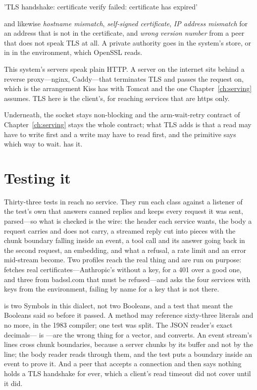 \begin{plain}
'TLS handshake: certificate verify failed: certificate has expired'
\end{plain}

and likewise \emph{hostname mismatch}, \emph{self-signed certificate},
\emph{IP address mismatch} for an address that is not in the certificate,
and \emph{wrong version number} from a peer that does not speak TLS at
all. A private authority goes in the system's store, or in
 in the environment, which OpenSSL reads.

\begin{stwarn}
This system's servers speak plain HTTP. A server on the internet sits
behind a reverse proxy---nginx, Caddy---that terminates TLS and passes the
request on, which is the arrangement Kiss has with Tomcat and the one
Chapter~\ref{ch:serving} assumes. TLS here is the client's, for reaching
services that are https only.
\end{stwarn}

Underneath, the socket stays non-blocking and the arm-wait-retry contract
of Chapter~\ref{ch:serving} stays the whole contract; what TLS adds is that
a read may have to write first and a write may have to read first, and the
primitive says which way to wait.  has it.

\section{Testing it}

Thirty-three tests in  reach no service. They run each
class against a listener of the test's own that answers canned replies
and keeps every request it was sent, parsed---so what is checked is the
wire: the header each service wants, the body a request carries and does
not carry, a streamed reply cut into pieces with the chunk boundary falling
inside an event, a tool call and its answer going back in the second
request, an embedding, and what a refusal, a rate limit and an error
mid-stream become. Two profiles reach the real thing and are run on
purpose:  fetches real certificates---Anthropic's without
a key, for a 401 over a good one, and three from badssl.com that must be
refused---and  asks the four services with keys from the
environment, failing by name for a key that is not there.

\begin{stnote}
 is two Symbols in this dialect, not two Booleans, and a
test that meant the Booleans said so before it passed. A method may
reference sixty-three literals and no more, in the 1983 compiler; one test
was split. The JSON reader's exact decimals--- is ---are
the wrong thing for a vector, and  converts. An event stream's
lines cross chunk boundaries, because a server chunks by its buffer and
not by the line; the body reader reads through them, and the test puts a
boundary inside an event to prove it. And a peer that accepts a connection
and then says nothing holds a TLS handshake for ever, which a client's read
timeout did not cover until it did.
\end{stnote}

